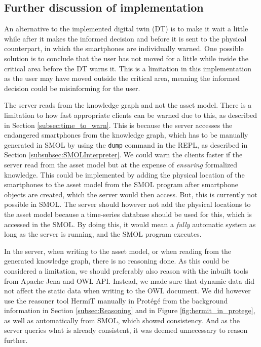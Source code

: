 \documentclass{article}
\begin{document}
\subsection{Further discussion of implementation}\label{subsec:implementation_further_discussion}
An alternative to the implemented digital twin (DT) is to make it wait a little while after it makes the informed decision and before it is sent to the physical counterpart, in which the smartphones are individually warned. One possible solution is to conclude that the user has not moved for a little while inside the critical area before the DT warns it. This is a limitation in this implementation as the user may have moved outside the critical area, meaning the informed decision could be misinforming for the user.

The server reads from the knowledge graph and not the asset model.
There is a limitation to how fast appropriate clients can be warned due to this, as described in Section \ref{subsec:time_to_warn}. This is because the server accesses the endangered smartphones from the knowledge graph, which has to be manually generated in SMOL by using the \verb|dump| command in the REPL, as described in Section \ref{subsubsec:SMOLInterpreter}. We could warn the clients faster if the server read from the asset model but at the expense of \emph{ensuring} formalized knowledge. This could be implemented by adding the physical location of the smartphones to the asset model from the SMOL program after smartphone objects are created, which the server would then access. But, this is currently not possible in SMOL. The server should however not add the physical locations to the asset model because a time-series database should be used for this, which is accessed in the SMOL. By doing this, it would mean a \emph{fully} automatic system as long as the server is running, and the SMOL program executes.

In the server, when writing to the asset model, or when reading from the generated knowledge graph, there is no reasoning done. As this could be considered a limitation, we should preferably also reason with the inbuilt tools from Apache Jena and OWL API. Instead, we made sure that dynamic data did not affect the static data when writing to the OWL document. We did however use the reasoner tool HermiT manually in Protégé from the background information in Section \ref{subsec:Reasoning} and in Figure \ref{fig:hermit_in_protege}, as well as automatically from SMOL, which showed consistency. And as the server queries what is already consistent, it was deemed unnecessary to reason further.
\end{document}
